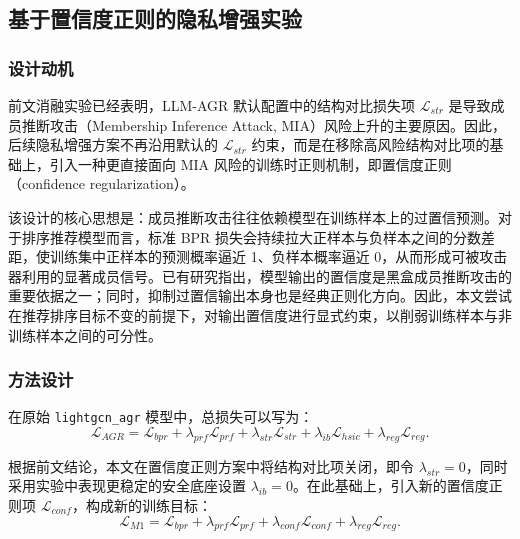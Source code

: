 \subsection{基于置信度正则的隐私增强实验}

\subsubsection{设计动机}
前文消融实验已经表明，LLM-AGR 默认配置中的结构对比损失项 $\mathcal{L}_{str}$ 是导致成员推断攻击（Membership Inference Attack, MIA）风险上升的主要原因。因此，后续隐私增强方案不再沿用默认的 $\mathcal{L}_{str}$ 约束，而是在移除高风险结构对比项的基础上，引入一种更直接面向 MIA 风险的训练时正则机制，即置信度正则（confidence regularization）。

该设计的核心思想是：成员推断攻击往往依赖模型在训练样本上的过置信预测。对于排序推荐模型而言，标准 BPR 损失会持续拉大正样本与负样本之间的分数差距，使训练集中正样本的预测概率逼近 1、负样本概率逼近 0，从而形成可被攻击器利用的显著成员信号。已有研究指出，模型输出的置信度是黑盒成员推断攻击的重要依据之一\cite{jia2019memguard,chen2024overconfidence}；同时，抑制过置信输出本身也是经典正则化方向\cite{pereyra2017confidence}。因此，本文尝试在推荐排序目标不变的前提下，对输出置信度进行显式约束，以削弱训练样本与非训练样本之间的可分性。

\subsubsection{方法设计}
在原始 \texttt{lightgcn\_agr} 模型中，总损失可以写为：
\begin{equation}
\mathcal{L}_{AGR}
=
\mathcal{L}_{bpr}
+ \lambda_{prf}\mathcal{L}_{prf}
+ \lambda_{str}\mathcal{L}_{str}
+ \lambda_{ib}\mathcal{L}_{hsic}
+ \lambda_{reg}\mathcal{L}_{reg}.
\end{equation}

根据前文结论，本文在置信度正则方案中将结构对比项关闭，即令 $\lambda_{str}=0$，同时采用实验中表现更稳定的安全底座设置 $\lambda_{ib}=0$。在此基础上，引入新的置信度正则项 $\mathcal{L}_{conf}$，构成新的训练目标：
\begin{equation}
\mathcal{L}_{M1}
=
\mathcal{L}_{bpr}
+ \lambda_{prf}\mathcal{L}_{prf}
+ \lambda_{conf}\mathcal{L}_{conf}
+ \lambda_{reg}\mathcal{L}_{reg}.
\end{equation}

